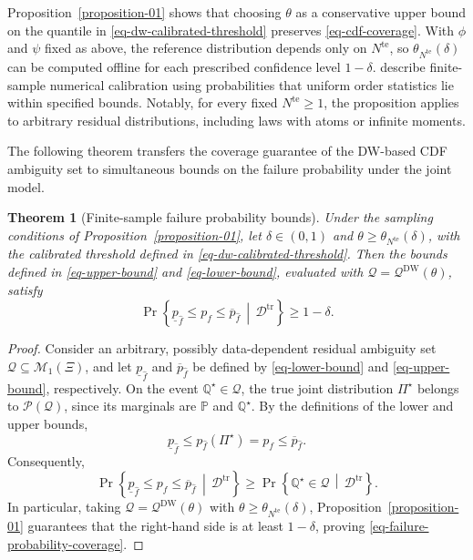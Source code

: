 \documentclass[review,11pt,3p,authoryear,nopreprintline]{elsarticle}
\newtheorem{theorem}{Theorem}
\begin{document}
Proposition~\ref{proposition-01} shows that choosing $\theta$ as a conservative upper bound on the quantile in \eqref{eq-dw-calibrated-threshold} preserves \eqref{eq-cdf-coverage}. With $\phi$ and $\psi$ fixed as above, the reference distribution depends only on $N^{\mathrm{te}}$, so $\theta_{N^{\mathrm{te}}}(\delta)$ can be computed offline for each prescribed confidence level $1-\delta$. \citet{L.J23} describe finite-sample numerical calibration using probabilities that uniform order statistics lie within specified bounds. Notably, for every fixed $N^{\mathrm{te}}\ge1$, the proposition applies to arbitrary residual distributions, including laws with atoms or infinite moments.

The following theorem transfers the coverage guarantee of the DW-based CDF ambiguity set to simultaneous bounds on the failure probability under the joint model.

\begin{theorem}[Finite-sample failure probability bounds]
  \label{theorem-01}
  Under the sampling conditions of Proposition~\ref{proposition-01}, let $\delta\in(0,1)$ and $\theta\ge\theta_{N^{\mathrm{te}}}(\delta)$, with the calibrated threshold defined in \eqref{eq-dw-calibrated-threshold}. Then the bounds defined in \eqref{eq-upper-bound} and \eqref{eq-lower-bound}, evaluated with $\mathcal Q=\mathcal Q^{\mathrm{DW}}(\theta)$, satisfy
  \begin{equation}
    \Pr\left\{\underline p_{\hat f}\le p_f\le\overline p_{\hat f}\,\middle|\,\mathcal D^{\mathrm{tr}}\right\}\ge1-\delta.
    \label{eq-failure-probability-coverage}
  \end{equation}
\end{theorem}

\begin{proof}
  Consider an arbitrary, possibly data-dependent residual ambiguity set $\mathcal Q\subseteq\mathcal M_1(\Xi)$, and let $\underline p_{\hat f}$ and $\overline p_{\hat f}$ be defined by \eqref{eq-lower-bound} and \eqref{eq-upper-bound}, respectively. On the event $\mathbb Q^\star\in\mathcal Q$, the true joint distribution $\Pi^\star$ belongs to $\mathcal P(\mathcal Q)$, since its marginals are $\mathbb P$ and $\mathbb Q^\star$. By the definitions of the lower and upper bounds,
  \[
    \underline p_{\hat f}
    \le p_{\hat f}(\Pi^\star)
    =p_f
    \le\overline p_{\hat f}.
  \]
  Consequently,
  \[
    \Pr\left\{
      \underline p_{\hat f}\le p_f\le\overline p_{\hat f}
      \,\middle|\,\mathcal D^{\mathrm{tr}}
    \right\}
    \ge
    \Pr\left\{
      \mathbb Q^\star\in\mathcal Q
      \,\middle|\,\mathcal D^{\mathrm{tr}}
    \right\}.
  \]
  In particular, taking $\mathcal Q=\mathcal Q^{\mathrm{DW}}(\theta)$ with $\theta\ge\theta_{N^{\mathrm{te}}}(\delta)$, Proposition~\ref{proposition-01} guarantees that the right-hand side is at least $1-\delta$, proving \eqref{eq-failure-probability-coverage}.
\end{proof}
\end{document}
